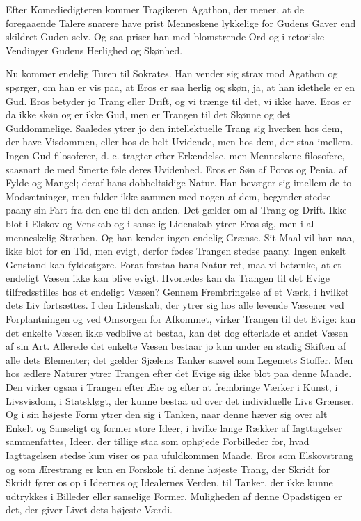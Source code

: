 \documentclass[12pt,a4paper,openany]{book}
\newcommand{\opage}[1]{\marginnote{\footnotesize\textit{[#1]}}}
\begin{document}
Efter Komediedigteren kommer Tragikeren Agathon, der
mener, at de foregaaende Talere snarere have prist Menneskene
lykkelige for Gudens Gaver end skildret Guden selv. Og saa
\setcounter{footnote}{0}%
\opage{86}priser han med blomstrende Ord og i retoriske Vendinger Gudens
Herlighed og Skønhed.

Nu kommer endelig Turen til Sokrates. Han vender sig strax
mod Agathon og spørger, om han er vis paa, at Eros er saa
herlig og skøn, ja, at han idethele er en Gud. Eros betyder jo
Trang eller Drift, og vi trænge til det, vi ikke have. Eros er da
ikke skøn og er ikke Gud, men er Trangen til det Skønne og det
Guddommelige. Saaledes ytrer jo den intellektuelle Trang sig
hverken hos dem, der have Visdommen, eller hos de helt
Uvidende, men hos dem, der staa imellem. Ingen Gud filosoferer,
d. e. tragter efter Erkendelse, men Menneskene filosofere, saasnart
de med Smerte føle deres Uvidenhed. Eros er Søn af
Poros og Penia, af Fylde og Mangel; deraf hans dobbeltsidige
Natur. Han bevæger sig imellem de to Modsætninger, men falder
ikke sammen med nogen af dem, begynder stedse paany sin
Fart fra den ene til den anden. Det gælder om al Trang og
Drift. Ikke blot i Elskov og Venskab og i sanselig Lidenskab
ytrer Eros sig, men i al menneskelig Stræben. Og han kender
ingen endelig Grænse. Sit Maal vil han naa, ikke blot for en
Tid, men evigt, derfor fødes Trangen stedse paany. Ingen enkelt
Genstand kan fyldestgøre. Forat forstaa hans Natur ret, maa vi
betænke, at et endeligt Væsen ikke kan blive evigt. Hvorledes
kan da Trangen til det Evige tilfredsstilles hos et endeligt Væsen?
Gennem Frembringelse af et Værk, i hvilket dets Liv fortsættes.
I den Lidenskab, der ytrer sig hos alle levende Væsener ved Forplantningen
og ved Omsorgen for Afkommet, virker Trangen
til det Evige: kan det enkelte Væsen ikke vedblive at bestaa,
kan det dog efterlade et andet Væsen af sin Art. Allerede det
enkelte Væsen bestaar jo kun under en stadig Skiften af alle
dets Elementer; det gælder Sjælens Tanker saavel som Legemets
Stoffer. Men hos ædlere Naturer ytrer Trangen efter det Evige
sig ikke blot paa denne Maade. Den virker ogsaa i Trangen efter
Ære og efter at frembringe Værker i Kunst, i Livsvisdom, i Statskløgt,
der kunne bestaa ud over det individuelle Livs Grænser. Og
i sin højeste Form ytrer den sig i Tanken, naar denne hæver
sig over alt Enkelt og Sanseligt og former store Ideer, i hvilke
lange Rækker af Iagttagelser sammenfattes, Ideer, der tillige staa
\setcounter{footnote}{0}%
\opage{87}som ophøjede Forbilleder for, hvad Iagttagelsen stedse kun viser
os paa ufuldkommen Maade. Eros som Elskovstrang og som Ærestrang
er kun en Forskole til denne højeste Trang, der Skridt for
Skridt fører os op i Ideernes og Idealernes Verden, til Tanker,
der ikke kunne udtrykkes i Billeder eller sanselige Former. Muligheden
af denne Opadstigen er det, der giver Livet dets højeste
Værdi.
\end{document}
